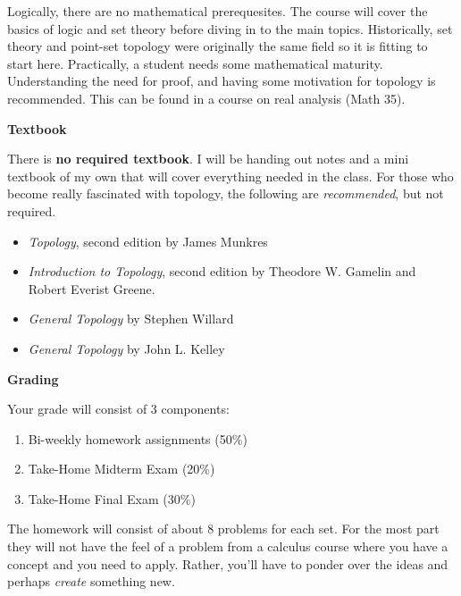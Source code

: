 \documentclass{article}
\begin{document}
    Logically, there are no mathematical prerequesites. The course will cover
    the basics of logic and set theory before diving in to the main topics.
    Historically, set theory and point-set topology were originally the same
    field so it is fitting to start here. Practically, a student needs some
    mathematical maturity. Understanding the need for proof, and having some
    motivation for topology is recommended. This can be found in a course on
    real analysis (Math 35).
    \par\hfill\par
    \textbf{Textbook}
    \par\hfill\par
    There is \textbf{no required textbook}. I will be handing out notes and a
    mini textbook of my own that will cover everything needed in the class.
    For those who become really fascinated with topology, the following are
    \textit{recommended}, but not required.
    \begin{itemize}
        \item \textit{Topology}, second edition by James Munkres
        \item \textit{Introduction to Topology}, second edition
            by Theodore W. Gamelin and Robert Everist Greene.
        \item \textit{General Topology} by Stephen Willard
        \item \textit{General Topology} by John L. Kelley
    \end{itemize}
    \par\hfill\par
    \textbf{Grading}
    \par\hfill\par
    Your grade will consist of 3 components:
    \begin{enumerate}
        \item Bi-weekly homework assignments (50\%)
        \item Take-Home Midterm Exam (20\%)
        \item Take-Home Final Exam (30\%)
    \end{enumerate}
    The homework will consist of about 8 problems for each set. For the most
    part they will not have the feel of a problem from a calculus course where
    you have a concept and you need to apply. Rather, you'll have to ponder
    over the ideas and perhaps \textit{create} something new.
    \par\hfill\par
\end{document}

